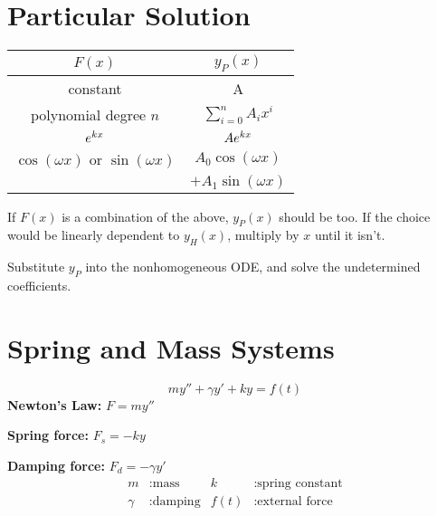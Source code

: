 \documentclass{article}
\begin{document}
\begin{multicols}{3}
    \section*{Particular Solution}
    \begin{table}[H]
        \centering
        \begin{tabular}{c | c}
            \toprule
            $F(x)$                                                             & $y_P(x)$                               \\
            \midrule
            constant                                                           & A                                      \\
            polynomial degree $n$                                              & $\displaystyle \sum_{i = 0}^n A_i x^i$ \\
            $e^{kx}$                                                          & $A e^{kx}$                            \\
            $\cos{\left( \omega x \right)}$ or $\sin{\left( \omega x \right)}$ & $A_0 \cos{\left( \omega x \right)}$    \\ & $+ A_1 \sin{\left( \omega x \right)}$ \\
            \bottomrule
        \end{tabular}
    \end{table}
    If $F(x)$ is a combination of the above, $y_P(x)$ should be too.
    If the choice would be linearly dependent to $y_H(x)$, multiply by $x$ until it isn't.

    Substitute $y_P$ into the nonhomogeneous ODE, and solve the undetermined coefficients.
    \section*{Spring and Mass Systems}
    \begin{equation*}
        m y'' + \gamma y' + k y = f(t)
    \end{equation*}
    \textbf{Newton's Law:} $F = m y''$

    \textbf{Spring force:} $F_s = -k y$

    \textbf{Damping force:} $F_d = -\gamma y'$
    \begin{align*}
        m      & : \text{mass}    & k    & : \text{spring constant} \\
        \gamma & : \text{damping} & f(t) & : \text{external force}
    \end{align*}

\end{multicols}
\end{document}
